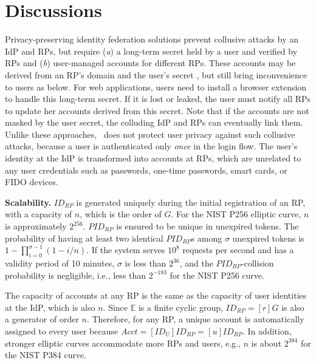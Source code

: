 \section{Discussions}
\label{sec:discussion}

Privacy-preserving identity federation solutions \cite{ELPASSO, UnlimitID, idemix, PseudoID, Opaak, uprov}
 prevent collusive attacks by an IdP and RPs,
 but require (\emph{a}) a long-term secret held by a user and verified by RPs
  and (\emph{b}) user-managed accounts for different RPs.
These accounts may be derived from an RP's domain and the user's secret \cite{ELPASSO, UnlimitID, Opaak, uprov,idemix},
 but still bring inconvenience to users as below.
For web applications, users need to install a browser extension to handle this long-term secret.
If it is lost or leaked, the user must notify all RPs to update her accounts derived from this secret.
Note that if the accounts are not masked by the user secret, the colluding IdP and RPs can eventually link them.
Unlike these approaches, \usso\ does not protect user privacy against such collusive attacks,
 because a user is authenticated only \emph{once} in the login flow.
 The user's identity at the IdP is transformed into accounts at RPs,
  which are unrelated to any user credentials such as passwords, one-time passwords, smart cards, or FIDO devices.

\noindent \textbf{Scalability.} $ID_{RP}$ is generated uniquely during the initial registration of an RP,
 with a capacity of $n$, which is the order of $G$. For the NIST P256 elliptic curve, $n$ is approximately $2^{256}$.
$PID_{RP}$ is ensured to be unique in unexpired tokens.
The probability of having at least two identical $PID_{RP}$s among $\sigma$ unexpired tokens is $1-\prod_{i=0}^{\sigma-1}(1-i/n)$.
If the system serves $10^{8}$ requests per second and has a validity period of 10 minutes, $\sigma$ is less than $2^{36}$,
 and the $PID_{RP}$-collision probability is negligible, i.e., less than $2^{-183}$ for the NIST P256 curve.

The capacity of accounts at any RP is the same as the capacity of user identities at the IdP,
 which is also $n$. Since $\mathbb{E}$ is a finite cyclic group, $ID_{RP} = [r]G$ is also a generator of order $n$.
 Therefore, for any RP, a unique account is automatically assigned to every user because $Acct =  [ID_U]ID_{RP} = [u]ID_{RP}$.
In addition, stronger elliptic curves accommodate more RPs and users, e.g., $n$ is about $2^{384}$ for the NIST P384 curve.


